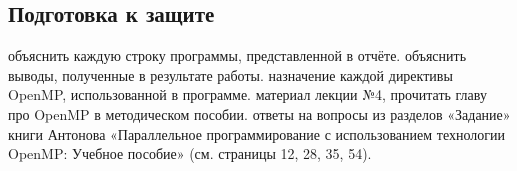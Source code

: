 { %
	\subsection{Подготовка к защите}
	\begin{enumerate}
		 объяснить каждую строку программы, представленной в отчёте.
		 объяснить выводы, полученные в результате работы.
		 назначение каждой директивы OpenMP, использованной в программе.
		 материал лекции №4, прочитать главу про OpenMP в методическом пособии.
		 ответы на вопросы из разделов «Задание» книги Антонова «Параллельное программирование с использованием технологии OpenMP: Учебное пособие» (см. страницы 12, 28, 35, 54).
	\end{enumerate}
}